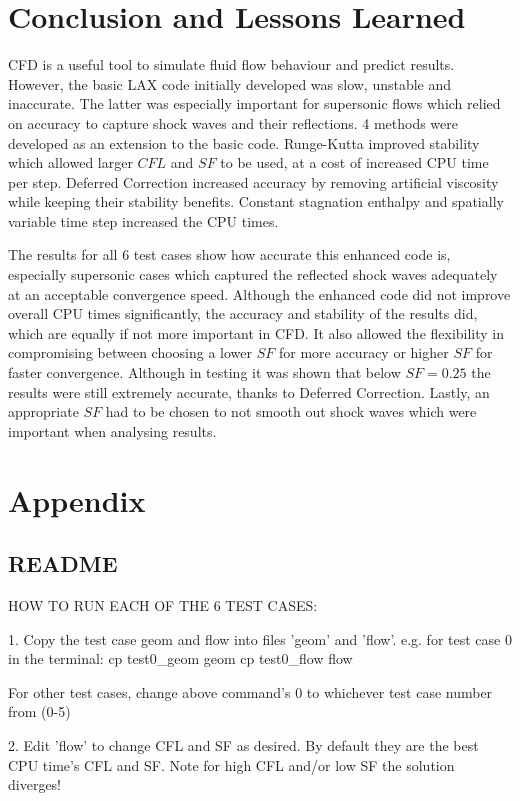 \documentclass[12pt, a4paper]{article}
\begin{document}
\section{Conclusion and Lessons Learned}
CFD is a useful tool to simulate fluid flow behaviour and predict results. However, the basic LAX code initially developed was slow, unstable and inaccurate. The latter was especially important for supersonic flows which relied on accuracy to capture shock waves and their reflections.  4 methods were developed as an extension to the basic code. Runge-Kutta improved stability which allowed larger $CFL$ and $SF$ to be used, at a cost of increased CPU time per step. Deferred Correction increased accuracy by removing artificial viscosity while keeping their stability benefits. Constant stagnation enthalpy and spatially variable time step increased the CPU times.

The results for all 6 test cases show how accurate this enhanced code is, especially supersonic cases which captured the reflected shock waves adequately at an acceptable convergence speed. Although the enhanced code did not improve overall CPU times significantly, the accuracy and stability of the results did, which are equally if not more important in CFD. It also allowed the flexibility in compromising between choosing a lower $SF$ for more accuracy or higher $SF$ for faster convergence. Although in testing it was shown that below $SF=0.25$ the results were still extremely accurate, thanks to Deferred Correction. Lastly, an appropriate $SF$ had to be chosen to not smooth out shock waves which were important when analysing results.


\section{Appendix}\label{sec:Appendix}
\subsection{README}
\small
HOW TO RUN EACH OF THE 6 TEST CASES:

1.  Copy the test case geom and flow into files 'geom' and 'flow'. 
	e.g. for test case 0 in the terminal:
	cp test0\_geom geom
	cp test0\_flow flow

	For other test cases, change above command's 0 to whichever test case number from (0-5)

2.  Edit 'flow' to change CFL and SF as desired. By default they are the best CPU time's CFL and SF. Note for high CFL and/or low SF the solution diverges!
\end{document}
